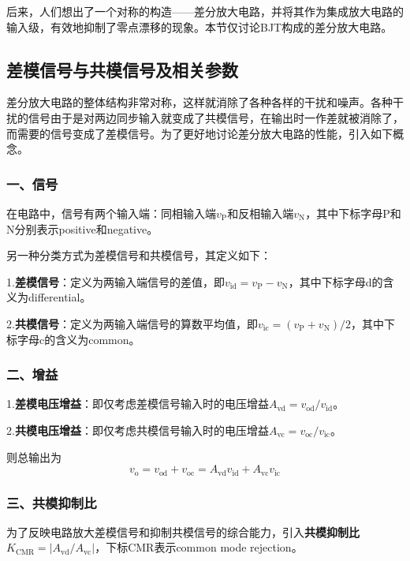 后来，人们想出了一个对称的构造——差分放大电路，并将其作为集成放大电路的输入级，有效地抑制了零点漂移的现象。本节仅讨论BJT构成的差分放大电路。

\subsection{差模信号与共模信号及相关参数}
差分放大电路的整体结构非常对称，这样就消除了各种各样的干扰和噪声。各种干扰的信号由于是对两边同步输入就变成了共模信号，在输出时一作差就被消除了，而需要的信号变成了差模信号。为了更好地讨论差分放大电路的性能，引入如下概念。

\subsubsection{一、信号}
在电路中，信号有两个输入端：同相输入端$v_{\mathrm{P}}$和反相输入端$v_{\mathrm{N}}$，其中下标字母P和N分别表示positive和negative。

另一种分类方式为差模信号和共模信号，其定义如下：

1.\textbf{差模信号}：定义为两输入端信号的差值，即$v_{\mathrm{id}}=v_{\mathrm{P}}-v_{\mathrm{N}}$，其中下标字母d的含义为differential。

2.\textbf{共模信号}：定义为两输入端信号的算数平均值，即$v_{\mathrm{ic}}=(v_{\mathrm{P}}+v_{\mathrm{N}})/2$，其中下标字母c的含义为common。

\subsubsection{二、增益}
1.\textbf{差模电压增益}：即仅考虑差模信号输入时的电压增益$A_{\mathrm{vd}}=v_{\mathrm{od}}/v_{\mathrm{id}}$。

2.\textbf{共模电压增益}：即仅考虑共模信号输入时的电压增益$A_{\mathrm{vc}}=v_{\mathrm{oc}}/v_{\mathrm{ic}}$。

则总输出为
\begin{equation*}
    v_\mathrm{o}=v_\mathrm{od}+v_\mathrm{oc}=A_\mathrm{vd}v_\mathrm{id}+A_\mathrm{vc}v_\mathrm{ic}
\end{equation*}

\subsubsection{三、共模抑制比}
为了反映电路放大差模信号和抑制共模信号的综合能力，引入\textbf{共模抑制比}$K_{\mathrm{CMR}}=|A_{\mathrm{vd}}/A_{\mathrm{vc}}|$，下标CMR表示common mode rejection。

